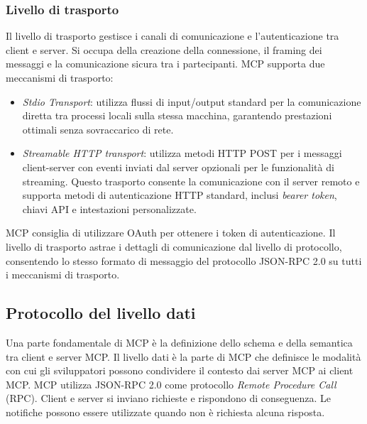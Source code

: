 \subsubsection{Livello di trasporto}
Il livello di trasporto gestisce i canali di comunicazione e l'autenticazione tra client e server. Si occupa della creazione della connessione, il framing dei messaggi e la comunicazione sicura tra i partecipanti.
MCP supporta due meccanismi di trasporto:
\begin{itemize}
\item \textit{Stdio Transport}: utilizza flussi di input/output standard per la comunicazione diretta tra processi locali sulla stessa macchina, garantendo prestazioni ottimali senza sovraccarico di rete.
\item \textit{Streamable HTTP transport}: utilizza metodi HTTP POST per i messaggi client-server con eventi inviati dal server opzionali per le funzionalità di streaming. Questo trasporto consente la comunicazione con il server remoto e supporta metodi di autenticazione HTTP standard, inclusi \textit{bearer token}, chiavi API e intestazioni personalizzate.
\end{itemize}
MCP consiglia di utilizzare OAuth per ottenere i token di autenticazione.
Il livello di trasporto astrae i dettagli di comunicazione dal livello di protocollo, consentendo lo stesso formato di messaggio del protocollo JSON-RPC 2.0 su tutti i meccanismi di trasporto.
\cite{modelcontextprotocol2024arch}

\subsection{Protocollo del livello dati}
Una parte fondamentale di MCP è la definizione dello schema e della semantica tra client e server MCP. Il livello dati è la parte di MCP che definisce le modalità con cui gli sviluppatori possono condividere il contesto dai server MCP ai client MCP.
MCP utilizza JSON-RPC 2.0 come protocollo \textit{Remote Procedure Call} (RPC). Client e server si inviano richieste e rispondono di conseguenza. Le notifiche possono essere utilizzate quando non è richiesta alcuna risposta.
\cite{modelcontextprotocol2024arch}

